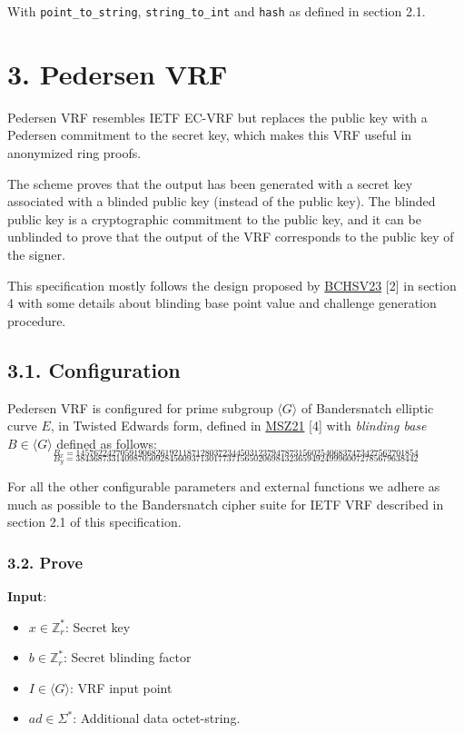 \documentclass[
]{article}
\providecommand{\tightlist}{%
  \setlength{\itemsep}{0pt}\setlength{\parskip}{0pt}}
\begin{document}
With \texttt{point\_to\_string}, \texttt{string\_to\_int} and
\texttt{hash} as defined in section 2.1.

\hypertarget{pedersen-vrf}{%
\section{3. Pedersen VRF}\label{pedersen-vrf}}

Pedersen VRF resembles IETF EC-VRF but replaces the public key with a
Pedersen commitment to the secret key, which makes this VRF useful in
anonymized ring proofs.

The scheme proves that the output has been generated with a secret key
associated with a blinded public key (instead of the public key). The
blinded public key is a cryptographic commitment to the public key, and
it can be unblinded to prove that the output of the VRF corresponds to
the public key of the signer.

This specification mostly follows the design proposed by
\href{https://eprint.iacr.org/2023/002}{BCHSV23} {[}2{]} in section 4
with some details about blinding base point value and challenge
generation procedure.

\hypertarget{configuration-1}{%
\subsection{3.1. Configuration}\label{configuration-1}}

Pedersen VRF is configured for prime subgroup \(\langle G \rangle\) of
Bandersnatch elliptic curve \(E\), in Twisted Edwards form, defined in
\href{https://eprint.iacr.org/2021/1152}{MSZ21} {[}4{]} with
\emph{blinding base} \(B \in \langle G \rangle\) defined as follows:
\[_{B_x = 14576224270591906826192118712803723445031237947873156025406837473427562701854}\]
\[_{B_y = 38436873314098705092845609371301773715650206984323659492499960072785679638442}\]

For all the other configurable parameters and external functions we
adhere as much as possible to the Bandersnatch cipher suite for IETF VRF
described in section 2.1 of this specification.

\hypertarget{prove-1}{%
\subsubsection{3.2. Prove}\label{prove-1}}

\textbf{Input}:

\begin{itemize}
\tightlist
\item
  \(x \in \mathbb{Z}^*_r\): Secret key
\item
  \(b \in \mathbb{Z}^*_r\): Secret blinding factor
\item
  \(I \in \langle G \rangle\): VRF input point
\item
  \(ad \in \Sigma^*\): Additional data octet-string.
\end{itemize}
\end{document}
